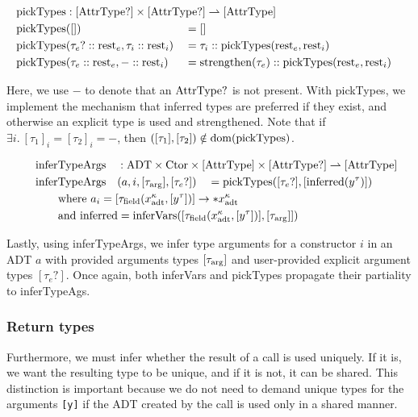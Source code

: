 \newcommand{\pickTypes}{\mathrm{pickTypes}}

\begin{alignat*}{3}
	\pickTypes &: \mathrlap{[\AttrType?] \times [\AttrType?] \rightharpoonup [\AttrType]} \\
	\pickTypes&([]) &&= [] \\
	\pickTypes&(\tau_e? :: \rest_e, \tau_i :: \rest_i) &&= \tau_i :: \pickTypes(\rest_e, \rest_i) \\
	\pickTypes&(\tau_e :: \rest_e, - :: \rest_i) &&= \strengthen(\tau_e) :: \pickTypes(\rest_e, \rest_i) \\
\end{alignat*}

Here, we use $-$ to denote that an $\mathrm{AttrType}?$ is not present.
With pickTypes, we implement the mechanism that inferred types are preferred if they exist, and otherwise an explicit type is used and strengthened. Note that if $\exists i.\ [\tau_1]_i = [\tau_2]_i = -$, then $([\tau_1], [\tau_2]) \notin \dom(\pickTypes)$.

\newcommand{\inferTypeArgs}{\mathrm{inferTypeArgs}}

\begin{alignat*}{3}
	&\inferTypeArgs &&: \mathrlap{\ADT \times \Ctor \times [\AttrType] \times [\AttrType?] \rightharpoonup [\AttrType]} \\
	&\inferTypeArgs&&(a, i, [\tau_\arrg], [\tau_e?]) &&= \pickTypes([\tau_e?], [\mathrm{inferred}(y^\tau)])\\
	&\rebreak{\text{where } a_i = [\tau_\field(x^\kappa_\adt, [y^\tau])] \to *x^\kappa_\adt} \\
	&\rebreak{\text{and } \mathrm{inferred} = \inferVars([\tau_\field(x^\kappa_\adt, [y^\tau])], [\tau_\arrg]])}
\end{alignat*}

Lastly, using inferTypeArgs, we infer type arguments for a constructor $i$ in an ADT $a$ with provided arguments types $[\tau_{\mathrm{arg}}]$ and user-provided explicit argument types $[\tau_e?]$. Once again, both inferVars and pickTypes propagate their partiality to inferTypeAgs.

\subsubsection{Return types}
Furthermore, we must infer whether the result of a  call is used uniquely. If it is, we want the resulting type to be unique, and if it is not, it can be shared. This distinction is important because we do not need to demand unique types for the arguments \texttt{[y]} if the ADT created by the  call is used only in a shared manner.

